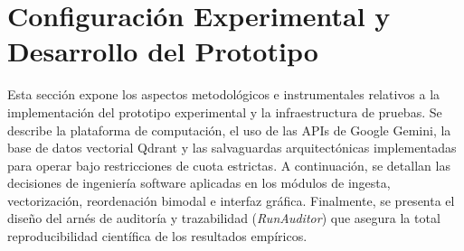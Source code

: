 \section[Configuración Experimental y Prototipo]{Configuración Experimental y Desarrollo del Prototipo}
\label{sec:configuracion_experimental_prototipo}

Esta sección expone los aspectos metodológicos e instrumentales relativos a la implementación del prototipo experimental y la infraestructura de pruebas. Se describe la plataforma de computación, el uso de las APIs de Google Gemini, la base de datos vectorial Qdrant y las salvaguardas arquitectónicas implementadas para operar bajo restricciones de cuota estrictas. A continuación, se detallan las decisiones de ingeniería software aplicadas en los módulos de ingesta, vectorización, reordenación bimodal e interfaz gráfica. Finalmente, se presenta el diseño del arnés de auditoría y trazabilidad (\textit{RunAuditor}) que asegura la total reproducibilidad científica de los resultados empíricos.


\newpage


\newpage


